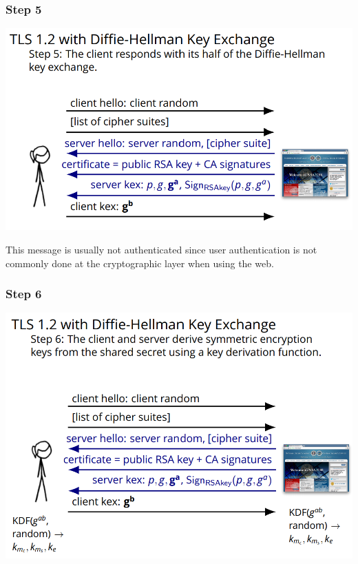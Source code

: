 \documentclass[11pt]{article} %
\begin{document}
{\subsubsection{Step 5}

\begin{center}
	\includegraphics[scale=.8]{./DiffieStep5.png}
\end{center}

\noindent This message is usually not authenticated since user authentication is not 
commonly done at the cryptographic layer when using the web.

\subsubsection{Step 6}

\begin{center}
	\includegraphics[scale=.8]{./DiffieStep6.png}
\end{center}

}
\end{document}
